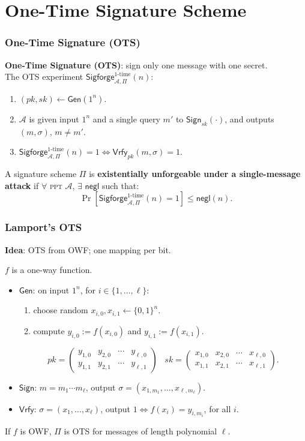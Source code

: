 \section{One-Time Signature Scheme}
\begin{frame}\frametitle{One-Time Signature (OTS)}
\textbf{One-Time Signature (OTS)}: sign only one message with one secret.\\
The OTS experiment $\mathsf{Sigforge}_{\mathcal{A},\Pi }^{\text{1-time}}(n)$:
\begin{enumerate}
\item $(pk,sk) \gets \mathsf{Gen}(1^n)$.
\item $\mathcal{A}$ is given input $1^n$ and a \alert{single query} $m'$ to $\mathsf{Sign}_{sk}(\cdot)$, and outputs $(m,\sigma)$, $m \neq m'$.
\item $\mathsf{Sigforge}_{\mathcal{A},\Pi }^{\text{1-time}}(n)=1 \iff \mathsf{Vrfy}_{pk}(m,\sigma)=1$. 
\end{enumerate}
\begin{definition}
A signature scheme $\Pi$ is \textbf{existentially unforgeable under a single-message attack} if $\forall$ \textsc{ppt} $\mathcal{A}$, $\exists$ $\mathsf{negl}$ such that:
\[ \Pr [\mathsf{Sigforge}_{\mathcal{A},\Pi }^{\text{1-time}}(n)=1] \le \mathsf{negl}(n).
\]
\end{definition}
\end{frame}
\begin{frame}\frametitle{Lamport's OTS}
\textbf{Idea}: OTS from OWF; one mapping per bit.
\begin{construction}
$f$ is a one-way function.
\begin{itemize}
\item $\mathsf{Gen}$: on input $1^n$, for $i \in \{1,\dotsc, \ell\}$:
\begin{enumerate}
\item choose random $x_{i,0}, x_{i,1} \gets \{0,1\}^n$.
\item compute $y_{i,0} := f(x_{i,0})$ and $y_{i,1} := f(x_{i,1})$.
\end{enumerate}
\[ pk = \begin{pmatrix} y_{1,0} & y_{2,0} & \cdots & y_{\ell,0} \\
y_{1,1} & y_{2,1} & \cdots & y_{\ell,1} \end{pmatrix}\;\;\; sk = \begin{pmatrix} x_{1,0} & x_{2,0} & \cdots & x_{\ell,0} \\
x_{1,1} & x_{2,1} & \cdots & x_{\ell,1} \end{pmatrix}. \]
\item $\mathsf{Sign}$: $m = m_1\cdots m_{\ell}$, output $\sigma = (x_{1,m_1},\dotsc,x_{\ell,m_{\ell}})$.
\item $\mathsf{Vrfy}$:  $\sigma = (x_1,\dotsc,x_{\ell})$, output $1 \iff f(x_i) = y_{i,m_i}$, for all $i$. 
\end{itemize}
\end{construction}
\begin{theorem}
If $f$ is OWF, $\Pi$ is OTS for messages of length polynomial $\ell$.
\end{theorem}
\end{frame}
